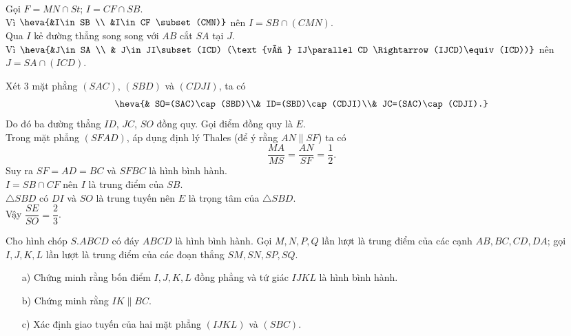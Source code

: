 \begin{bt}
{\begin{listEX}
			Gọi $ F=MN\cap St $; $ I=CF\cap SB $.\\
			Vì $ \heva{&I\in SB \\ &I\in CF \subset (CMN)} $ nên $ I=SB\cap (CMN) $.\\
			Qua $ I $ kẻ đường thẳng song song với $ AB $  cắt $ SA $ tại $ J $.\\
			Vì $ \heva{&J\in SA \\ & J\in JI\subset (ICD) (\text{vì } IJ\parallel CD \Rightarrow (IJCD)\equiv (ICD))} $ nên $ J=SA\cap (ICD) $.
			\item Xét $ 3 $ mặt phẳng $ (SAC) $, $ (SBD) $ và $ (CDJI) $, ta có
			$$\heva{& SO=(SAC)\cap (SBD)\\& ID=(SBD)\cap (CDJI)\\& JC=(SAC)\cap (CDJI).}$$
			Do đó ba đường thẳng $ ID $, $ JC $, $ SO $ đồng quy. Gọi điểm đồng quy là $ E $.\\
			Trong mặt phẳng $ (SFAD) $, áp dụng định lý Thales (để ý rằng $ AN\parallel SF $) ta có
			\[ \dfrac{MA}{MS}=\dfrac{AN}{SF}=\dfrac{1}{2}. \]
			Suy ra $ SF=AD=BC $ và $ SFBC $ là hình bình hành.\\
			$ I=SB\cap CF $ nên $ I $ là trung điểm của $ SB $.\\
			$ \triangle SBD $ có $ DI $ và $ SO $ là trung tuyến nên $ E $ là trọng tâm của $ \triangle SBD $.\\
			Vậy $ \dfrac{SE}{SO}=\dfrac{2}{3} $.
		\end{listEX}
	}
\end{bt}
\begin{bt}
	Cho hình chóp $S.ABCD$ có đáy $ABCD$ là hình bình hành. Gọi $M, N, P, Q$ lần lượt là trung điểm của các cạnh $AB, BC, CD, DA$; gọi $I, J, K, L$ lần lượt là trung điểm của các đoạn thẳng $SM, SN, SP, SQ$.
	\begin{itemize}
		\item [a)] Chứng minh rằng bốn điểm $I, J, K, L$ đồng phẳng và tứ giác $IJKL$ là hình bình hành.
		\item [b)] Chứng minh rằng $IK\parallel BC$.
		\item [c)] Xác định giao tuyến của hai mặt phẳng $\left(IJKL\right)$ và $\left(SBC\right)$.
	\end{itemize}
\end{bt}


